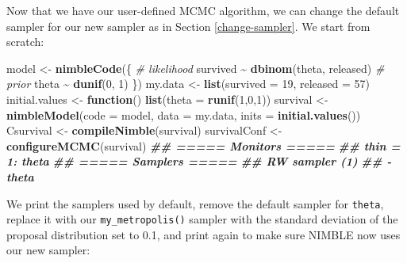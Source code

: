 \documentclass[
  12pt,
]{krantz}
\newenvironment{Shaded}{\begin{snugshade}}{\end{snugshade}}
\newcommand{\AttributeTok}[1]{\textcolor[rgb]{0.13,0.29,0.53}{#1}}
\newcommand{\CommentTok}[1]{\textcolor[rgb]{0.56,0.35,0.01}{\textit{#1}}}
\newcommand{\ControlFlowTok}[1]{\textcolor[rgb]{0.13,0.29,0.53}{\textbf{#1}}}
\newcommand{\DecValTok}[1]{\textcolor[rgb]{0.00,0.00,0.81}{#1}}
\newcommand{\DocumentationTok}[1]{\textcolor[rgb]{0.56,0.35,0.01}{\textbf{\textit{#1}}}}
\newcommand{\FunctionTok}[1]{\textcolor[rgb]{0.13,0.29,0.53}{\textbf{#1}}}
\newcommand{\NormalTok}[1]{#1}
\newcommand{\OtherTok}[1]{\textcolor[rgb]{0.56,0.35,0.01}{#1}}
\newcommand{\SpecialCharTok}[1]{\textcolor[rgb]{0.81,0.36,0.00}{\textbf{#1}}}
\begin{document}
Now that we have our user-defined MCMC algorithm, we can change the default sampler for our new sampler as in Section \ref{change-sampler}. We start from scratch:

\begin{Shaded}
\begin{Highlighting}[]
\NormalTok{model }\OtherTok{\textless{}{-}} \FunctionTok{nimbleCode}\NormalTok{(\{}
  \CommentTok{\# likelihood}
\NormalTok{  survived }\SpecialCharTok{\textasciitilde{}} \FunctionTok{dbinom}\NormalTok{(theta, released)}
  \CommentTok{\# prior}
\NormalTok{  theta }\SpecialCharTok{\textasciitilde{}} \FunctionTok{dunif}\NormalTok{(}\DecValTok{0}\NormalTok{, }\DecValTok{1}\NormalTok{)}
\NormalTok{\})}
\NormalTok{my.data }\OtherTok{\textless{}{-}} \FunctionTok{list}\NormalTok{(}\AttributeTok{survived =} \DecValTok{19}\NormalTok{, }\AttributeTok{released =} \DecValTok{57}\NormalTok{)}
\NormalTok{initial.values }\OtherTok{\textless{}{-}} \ControlFlowTok{function}\NormalTok{() }\FunctionTok{list}\NormalTok{(}\AttributeTok{theta =} \FunctionTok{runif}\NormalTok{(}\DecValTok{1}\NormalTok{,}\DecValTok{0}\NormalTok{,}\DecValTok{1}\NormalTok{))}
\NormalTok{survival }\OtherTok{\textless{}{-}} \FunctionTok{nimbleModel}\NormalTok{(}\AttributeTok{code =}\NormalTok{ model, }
                        \AttributeTok{data =}\NormalTok{ my.data, }
                        \AttributeTok{inits =} \FunctionTok{initial.values}\NormalTok{())}
\NormalTok{Csurvival }\OtherTok{\textless{}{-}} \FunctionTok{compileNimble}\NormalTok{(survival)}
\NormalTok{survivalConf }\OtherTok{\textless{}{-}} \FunctionTok{configureMCMC}\NormalTok{(survival)}
\DocumentationTok{\#\# ===== Monitors =====}
\DocumentationTok{\#\# thin = 1: theta}
\DocumentationTok{\#\# ===== Samplers =====}
\DocumentationTok{\#\# RW sampler (1)}
\DocumentationTok{\#\#   {-} theta}
\end{Highlighting}
\end{Shaded}

We print the samplers used by default, remove the default sampler for \texttt{theta}, replace it with our \texttt{my\_metropolis()} sampler with the standard deviation of the proposal distribution set to 0.1, and print again to make sure NIMBLE now uses our new sampler:
\end{document}
